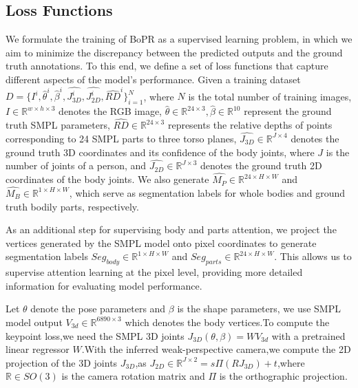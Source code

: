 \documentclass[10pt,twocolumn,letterpaper]{article}
\begin{document}
\subsection{Loss Functions}
We formulate the training of BoPR as a supervised learning problem, in which we aim to minimize the discrepancy between the predicted outputs and the ground truth annotations. To this end, we define a set of loss functions that capture different aspects of the model's performance. Given a training dataset $D = \{{I^{i},\hat{\theta}^{i},\hat{\beta}^{i},\hat{J^{i}_{3D}},\hat{J^{i}_{2D}},\hat{RD}^{i}}\}_{i=1}^{N}$, where $N$ is the total number of training images, $I \in \mathbb{R}^{w \times h \times 3}$ denotes the RGB image, $\hat{\theta}\in \mathbb{R}^{24 \times 3},\hat{\beta} \in \mathbb{R}^{10}$ represent the ground truth SMPL parameters, $\hat{RD} \in \mathbb{R}^{24\times 3} $ represents the relative depths of points corresponding to 24 SMPL parts to three torso planes, $\hat{J_{3D}} \in \mathbb{R}^{J \times 4}$ denotes the ground truth 3D coordinates and its confidence of the body joints, where $J$ is the number of joints of a person, and $\hat{J_{2D}} \in \mathbb{R}^{J \times 3}$ denotes the ground truth 2D coordinates of the body joints. We also generate $\hat{M_{P}} \in \mathbb{R}^{24 \times H \times W }$ and $\hat{M_{B}} \in \mathbb{R}^{1\times H \times W}$, which serve as segmentation labels for whole bodies and ground truth bodily parts, respectively.

As an additional step for supervising body and parts attention, we project the vertices generated by the SMPL model onto pixel coordinates to generate segmentation labels ${Seg_{body}} \in \mathbb{R}^{1\times H\times W}$ and ${Seg_{parts}} \in \mathbb{R}^{24\times H\times W}$. This allows us to supervise attention learning at the pixel level, providing more detailed information for evaluating model performance.

Let $\theta$ denote the pose parameters and $\beta$ is the shape parameters, we use SMPL model output $V_{3d} \in \mathbb{R}^{6890 \times 3}$ which denotes the body vertices.To compute the keypoint loss,we need the SMPL 3D joints $J_{3D}(\theta,\beta)=WV_{3d}$ with a pretrained linear regressor $W$.With the inferred weak-perspective camera,we compute the 2D projection of the 3D joints $J_{3D}$,as $J_{2D} \in \mathbb{R}^{J \times 2}=s\Pi(RJ_{3D})+t$,where $\mathbb{R}\in SO(3)$ is the camera rotation matrix and $\Pi$ is the orthographic projection.
\end{document}
